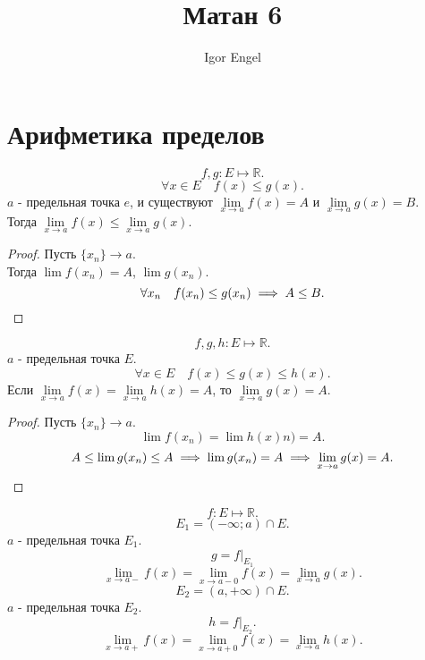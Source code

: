 \documentclass[11pt, oneside]{article}   	%
\title{Матан 6}
\author{Igor Engel}
\date{}
\begin{document}
\maketitle
\section{Арифметика пределов}
    \begin{theorem}
        \[ f, g: E \mapsto \mathbb{R} .\]
        \[ \forall{x\in E}\quad f(x) \le g(x)  .\]
        $a$ - предельная точка $e$, и существуют $\lim\limits_{x \to a} f(x) = A$ и $\lim\limits_{x \to a} g(x) = B$.\\
        Тогда $\lim\limits_{x \to a} f(x) \le \lim\limits_{x \to a} g(x)$.
        \begin{proof}
            Пусть $\{x_n\} \to a$.\\
            Тогда $\lim f(x_n) = A$, $\lim g\left( x_n \right) $.\\
            \[ \forall{x_n}\quad f(x_n) \le g(x_n) \implies A\le B .\qedhere\] 
        \end{proof}
    \end{theorem}
    \begin{theorem}
        \[ f,g,h: E \mapsto \mathbb{R} .\]
        $a$ - предельная точка $E$.\\
        \[ \forall{x\in E}\quad f(x) \le g(x) \le h(x)   .\]
        Если $\lim\limits_{x \to a} f(x) = \lim\limits_{x \to a} h(x) = A$, то $\lim\limits_{x \to a} g(x) = A$.
        \begin{proof}
            Пусть $\{x_n\} \to a$.\\
            \[ \lim f(x_n) = \lim h(x)n) = A .\]
            \[ A \le \lim g(x_n) \le A \implies \lim g(x_n) = A \implies \lim\limits_{x \to a} g(x) = A .\qedhere\] 
        \end{proof}
    \end{theorem}
    \begin{definition}
        \[ f: E \mapsto \mathbb{R} .\] 
        \[ E_1 = \left( -\infty; a \right)\cap E .\]
        $a$ - предельная точка $ E_1$.\\
        \[ g = \left.f\right|_{E_1}\]
        \[ \lim\limits_{x \to a-} f(x) = \lim\limits_{x \to a-0} f(x) = \lim\limits_{x \to a} g(x)  .\] 
        \[ E_2 = \left( a, +\infty \right)\cap E .\]
        $a$ - предельная точка $ E_2$.\\
        \[ h = \left.f\right|_{E_2} .\]
            \[ \lim\limits_{x \to a+} f(x) = \lim\limits_{x \to a+0} f(x) = \lim\limits_{x \to a} h(x) .\] 
    \end{definition}
\end{document}
